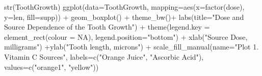\documentclass[]{article}
\newenvironment{Shaded}{}{}
\newcommand{\KeywordTok}[1]{\textcolor[rgb]{0.00,0.00,1.00}{{#1}}}
\newcommand{\DataTypeTok}[1]{{#1}}
\newcommand{\FloatTok}[1]{{#1}}
\newcommand{\CharTok}[1]{\textcolor[rgb]{0.00,0.50,0.50}{{#1}}}
\newcommand{\StringTok}[1]{\textcolor[rgb]{0.00,0.50,0.50}{{#1}}}
\newcommand{\OtherTok}[1]{\textcolor[rgb]{1.00,0.25,0.00}{{#1}}}
\newcommand{\NormalTok}[1]{{#1}}
\begin{document}
\begin{Shaded}
\end{Shaded}


\begin{Shaded}
\begin{Highlighting}[]
\KeywordTok{str}\NormalTok{(ToothGrowth)}
\KeywordTok{ggplot}\NormalTok{(}\DataTypeTok{data=}\NormalTok{ToothGrowth, }\DataTypeTok{mapping=}\KeywordTok{aes}\NormalTok{(}\DataTypeTok{x=}\KeywordTok{factor}\NormalTok{(dose), }\DataTypeTok{y=}\NormalTok{len, }\DataTypeTok{fill=}\NormalTok{supp)) +}\StringTok{ }
\StringTok{        }\KeywordTok{geom_boxplot}\NormalTok{() +}\StringTok{ }
\StringTok{        }\KeywordTok{theme_bw}\NormalTok{()+}
\StringTok{        }\KeywordTok{labs}\NormalTok{(}\DataTypeTok{title=}\StringTok{"Dose and Source Dependence of the Tooth Growth"}\NormalTok{) +}
\StringTok{        }\KeywordTok{theme}\NormalTok{(}\DataTypeTok{legend.key =} \KeywordTok{element_rect}\NormalTok{(}\DataTypeTok{colour =} \OtherTok{NA}\NormalTok{), }\DataTypeTok{legend.position=}\StringTok{"bottom"}\NormalTok{) +}
\StringTok{        }\KeywordTok{xlab}\NormalTok{(}\StringTok{"Source Dose, milligrams"}\NormalTok{) +}\KeywordTok{ylab}\NormalTok{(}\StringTok{"Tooth length, microns"}\NormalTok{) +}
\StringTok{        }\KeywordTok{scale_fill_manual}\NormalTok{(}\DataTypeTok{name=}\StringTok{"Plot 1.   Vitamin C Sources"}\NormalTok{,}
                            \DataTypeTok{labels=}\KeywordTok{c}\NormalTok{(}\StringTok{"Orange Juice"}\NormalTok{, }\StringTok{"Ascorbic Acid"}\NormalTok{),}
                            \DataTypeTok{values=}\KeywordTok{c}\NormalTok{(}\StringTok{"orange1"}\NormalTok{, }\StringTok{"yellow"}\NormalTok{))}
\end{Highlighting}
\end{Shaded}
\end{document}
